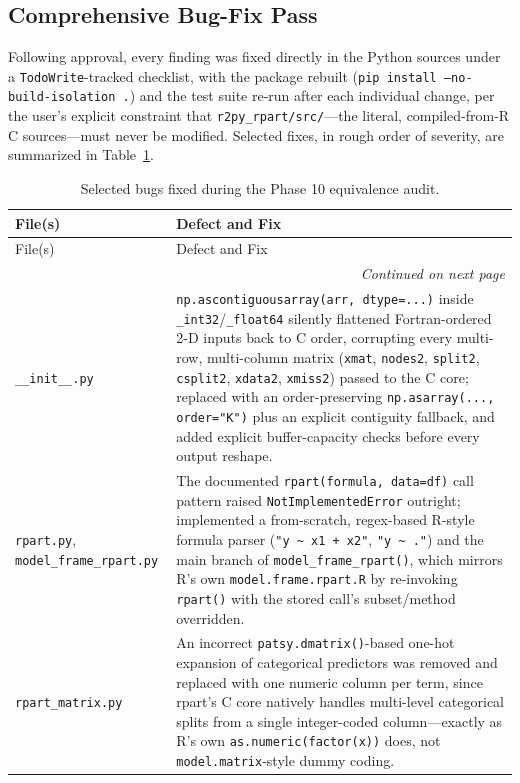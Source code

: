 \documentclass[12pt]{article}
\begin{document}
\subsection{Comprehensive Bug-Fix Pass}

Following approval, every finding was fixed directly in the Python sources under a \texttt{TodoWrite}-tracked checklist, with the package rebuilt (\texttt{pip install --no-build-isolation .}) and the test suite re-run after each individual change, per the user's explicit constraint that \texttt{r2py\_rpart/src/}---the literal, compiled-from-R C sources---must never be modified. Selected fixes, in rough order of severity, are summarized in Table~\ref{tab:phase10bugs}.

\begin{longtable}{p{2.6cm}p{9.9cm}}
\caption{Selected bugs fixed during the Phase 10 equivalence audit.\label{tab:phase10bugs}} \\
\toprule
File(s) & Defect and Fix \\
\midrule
\endfirsthead
\toprule
File(s) & Defect and Fix \\
\midrule
\endhead
\midrule
\multicolumn{2}{r}{\textit{Continued on next page}} \\
\endfoot
\bottomrule
\endlastfoot
\texttt{\_\_init\_\_.py} & \texttt{np.ascontiguousarray(arr, dtype=...)} inside \texttt{\_int32}/\texttt{\_float64} silently flattened Fortran-ordered 2-D inputs back to C order, corrupting every multi-row, multi-column matrix (\texttt{xmat}, \texttt{nodes2}, \texttt{split2}, \texttt{csplit2}, \texttt{xdata2}, \texttt{xmiss2}) passed to the C core; replaced with an order-preserving \texttt{np.asarray(..., order="K")} plus an explicit contiguity fallback, and added explicit buffer-capacity checks before every output reshape. \\
\texttt{rpart.py}, \texttt{model\_frame\_rpart.py} & The documented \texttt{rpart(formula, data=df)} call pattern raised \texttt{NotImplementedError} outright; implemented a from-scratch, regex-based R-style formula parser (\texttt{"y \textasciitilde\ x1 + x2"}, \texttt{"y \textasciitilde\ ."}) and the main branch of \texttt{model\_frame\_rpart()}, which mirrors R's own \texttt{model.frame.rpart.R} by re-invoking \texttt{rpart()} with the stored call's subset/method overridden. \\
\texttt{rpart\_matrix.py} & An incorrect \texttt{patsy.dmatrix()}-based one-hot expansion of categorical predictors was removed and replaced with one numeric column per term, since rpart's C core natively handles multi-level categorical splits from a single integer-coded column---exactly as R's own \texttt{as.numeric(factor(x))} does, not \texttt{model.matrix}-style dummy coding. \\

\end{longtable}
\end{document}

